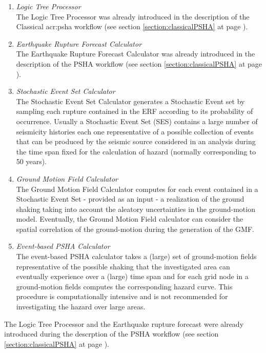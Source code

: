 \begin{enumerate}
%
\item \emph{Logic Tree Processor} \hfill \\
The Logic Tree Processor was already 
introduced in the description of the Classical \gls{acr:psha} workflow 
(see section \ref{section:classicalPSHA} at page 
\pageref{section:classicalPSHA}).
%
\item \emph{Earthquake Rupture Forecast Calculator} \hfill \\ 
The Earthquake Rupture Forecast Calculator was already 
introduced in the description of the PSHA workflow (see section 
\ref{section:classicalPSHA} at page \pageref{section:classicalPSHA}).
%
\item \emph{Stochastic Event Set Calculator} \hfill \\
The Stochastic Event Set Calculator generates a Stochastic Event set 
by sampling each rupture contained in the ERF according to its 
probability of occurrence. Usually a Stochastic Event Set (SES) contains
a large number of seismicity histories each one representative of a  
possible collection of events that can be produced by the seismic source
considered in an analysis during the time span fixed for the calculation
of hazard (normally corresponding to 50 years).
%
\item \emph{Ground Motion Field Calculator} \hfill \\
The Ground Motion Field Calculator computes for each event contained in a 
Stochastic Event Set - provided as an input - a realization of the 
ground shaking taking into account the aleatory uncertainties in 
the ground-motion model. Eventually, the Ground Motion Field calculator 
can consider the spatial correlation of the ground-motion during the 
generation of the GMF.
%
\item \emph{Event-based PSHA Calculator} \hfill \\
The event-based PSHA calculator takes a (large) set of ground-motion 
fields representative of the possible shaking that the investigated 
area can eventually experience over a (large) time span and for each 
grid node in a ground-motion fields computes the corresponding hazard 
curve. 
%
This procedure is computationally intensive and is not recommended for 
investigating the hazard over large areas. 
\end{enumerate}

The Logic Tree Processor and the Earthquake rupture forecast were already 
introduced during the descrption of the PSHA workflow (see section 
\ref{section:classicalPSHA} at page \pageref{section:classicalPSHA}).
%
